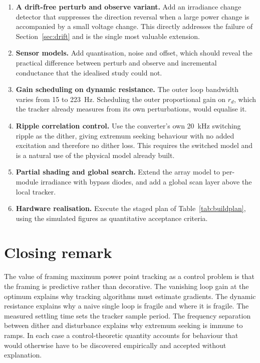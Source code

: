 \begin{enumerate}[leftmargin=1.6em]
  \item \textbf{A drift-free perturb and observe variant.} Add an irradiance
        change detector that suppresses the direction reversal when a large
        power change is accompanied by a small voltage change. This directly
        addresses the failure of Section~\ref{sec:drift} and is the single most
        valuable extension.
  \item \textbf{Sensor models.} Add quantisation, noise and offset, which should
        reveal the practical difference between perturb and observe and
        incremental conductance that the idealised study could not.
  \item \textbf{Gain scheduling on dynamic resistance.} The outer loop bandwidth
        varies from \SI{15}{} to \SI{223}{\hertz}. Scheduling the outer
        proportional gain on $r_d$, which the tracker already measures from its
        own perturbations, would equalise it.
  \item \textbf{Ripple correlation control.} Use the converter's own
        \SI{20}{\kilo\hertz} switching ripple as the dither, giving extremum
        seeking behaviour with no added excitation and therefore no dither loss.
        This requires the switched model and is a natural use of the physical
        model already built.
  \item \textbf{Partial shading and global search.} Extend the array model to
        per-module irradiance with bypass diodes, and add a global scan layer
        above the local tracker.
  \item \textbf{Hardware realisation.} Execute the staged plan of
        Table~\ref{tab:buildplan}, using the simulated figures as quantitative
        acceptance criteria.
\end{enumerate}

\section{Closing remark}

The value of framing maximum power point tracking as a control problem is that
the framing is predictive rather than decorative. The vanishing loop gain at the
optimum explains why tracking algorithms must estimate gradients. The dynamic
resistance explains why a naive single loop is fragile and where it is fragile.
The measured settling time sets the tracker sample period. The frequency
separation between dither and disturbance explains why extremum seeking is
immune to ramps. In each case a control-theoretic quantity accounts for
behaviour that would otherwise have to be discovered empirically and accepted
without explanation.
